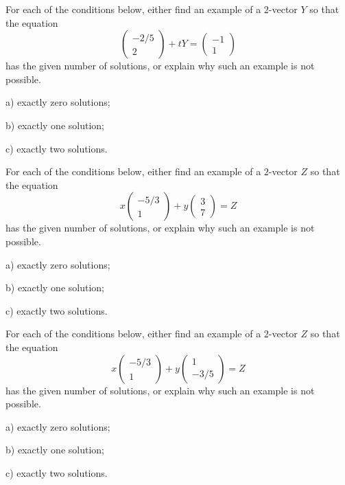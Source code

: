 \documentclass[cahier-main.tex]{subfiles}
\begin{document}
\begin{task}
For each of the conditions below, either find an example of a $2$-vector $Y$ so that the equation
\[
\begin{pmatrix}-2/5\\2\end{pmatrix} + tY = \begin{pmatrix}-1\\1 \end{pmatrix} 
\]
has the given number of solutions, or explain why such an example is not possible.
\begin{compactitem}
\item[a)] exactly zero solutions;
\item[b)] exactly one solution; 
\item[c)] exactly two solutions.
\end{compactitem}
\end{task}

\begin{task}
For each of the conditions below, either find an example of a $2$-vector $Z$ so that the equation
\[
x\begin{pmatrix}-5/3\\1\end{pmatrix} + y\begin{pmatrix}3\\7 \end{pmatrix} = Z
\]
has the given number of solutions, or explain why such an example is not possible.
\begin{compactitem}
\item[a)] exactly zero solutions;
\item[b)] exactly one solution; 
\item[c)] exactly two solutions.
\end{compactitem}
\end{task}

\begin{task}
For each of the conditions below, either find an example of a $2$-vector $Z$ so that the equation
\[
x\begin{pmatrix}-5/3\\1\end{pmatrix} + y\begin{pmatrix}1\\-3/5 \end{pmatrix} = Z
\]
has the given number of solutions, or explain why such an example is not possible.
\begin{compactitem}
\item[a)] exactly zero solutions;
\item[b)] exactly one solution; 
\item[c)] exactly two solutions.
\end{compactitem}
\end{task}
\end{document}
